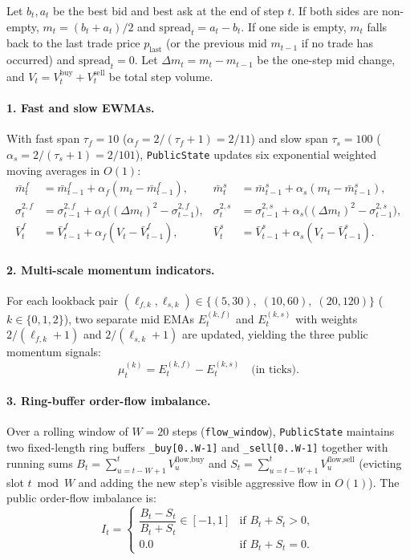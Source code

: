 \documentclass[11pt,a4paper]{article}
\newcommand{\code}[1]{\texttt{#1}}
\begin{document}
Let $b_t, a_t$ be the best bid and best ask at the end of step $t$. If both sides are non-empty,
$m_t = (b_t + a_t)/2$ and $\text{spread}_t = a_t - b_t$. If one side is empty, $m_t$ falls back to the
last trade price $p_{\text{last}}$ (or the previous mid $m_{t-1}$ if no trade has occurred) and
$\text{spread}_t = 0$. Let $\Delta m_t = m_t - m_{t-1}$ be the one-step mid change, and
$V_t = V^{\text{buy}}_t + V^{\text{sell}}_t$ be total step volume.

\paragraph{1. Fast and slow EWMAs.} With fast span $\tau_f = 10$ ($\alpha_f = 2/(\tau_f+1) = 2/11$) and
slow span $\tau_s = 100$ ($\alpha_s = 2/(\tau_s+1) = 2/101$), \code{PublicState} updates six exponential
weighted moving averages in $O(1)$:
\begin{align}
  \bar m^{f}_t &= \bar m^{f}_{t-1} + \alpha_f (m_t - \bar m^{f}_{t-1}), &
  \bar m^{s}_t &= \bar m^{s}_{t-1} + \alpha_s (m_t - \bar m^{s}_{t-1}), \\
  \sigma^{2,f}_t &= \sigma^{2,f}_{t-1} + \alpha_f \big((\Delta m_t)^2 - \sigma^{2,f}_{t-1}\big), &
  \sigma^{2,s}_t &= \sigma^{2,s}_{t-1} + \alpha_s \big((\Delta m_t)^2 - \sigma^{2,s}_{t-1}\big), \\
  \bar V^{f}_t &= \bar V^{f}_{t-1} + \alpha_f (V_t - \bar V^{f}_{t-1}), &
  \bar V^{s}_t &= \bar V^{s}_{t-1} + \alpha_s (V_t - \bar V^{s}_{t-1}).
\end{align}

\paragraph{2. Multi-scale momentum indicators.} For each lookback pair
$(\ell_{f,k}, \ell_{s,k}) \in \{(5,30),\; (10,60),\; (20,120)\}$ ($k \in \{0,1,2\}$), two separate mid
EMAs $E^{(k,f)}_t$ and $E^{(k,s)}_t$ with weights $2/(\ell_{f,k}+1)$ and $2/(\ell_{s,k}+1)$ are updated,
yielding the three public momentum signals:
\begin{equation}
  \mu^{(k)}_t = E^{(k,f)}_t - E^{(k,s)}_t \quad\text{(in ticks)}.
\end{equation}

\paragraph{3. Ring-buffer order-flow imbalance.} Over a rolling window of $W = 20$ steps
(\code{flow\_window}), \code{PublicState} maintains two fixed-length ring buffers \code{\_buy[0..W-1]}
and \code{\_sell[0..W-1]} together with running sums $B_t = \sum_{u=t-W+1}^t V^{\text{flow,buy}}_u$ and
$S_t = \sum_{u=t-W+1}^t V^{\text{flow,sell}}_u$ (evicting slot $t \bmod W$ and adding the new step's
visible aggressive flow in $O(1)$). The public order-flow imbalance is:
\begin{equation}
  \label{eq:imbalance}
  I_t = \begin{cases}
    \dfrac{B_t - S_t}{B_t + S_t} \in [-1, 1] & \text{if } B_t + S_t > 0, \\[6pt]
    0.0 & \text{if } B_t + S_t = 0.
  \end{cases}
\end{equation}
\end{document}

